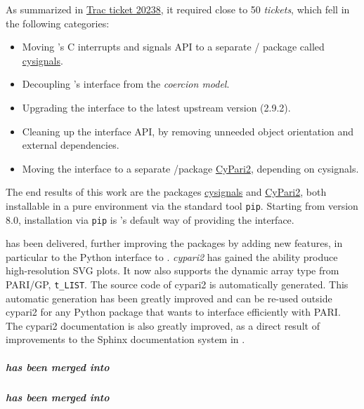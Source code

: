 As summarized in
\href{http://trac.sagemath.org/ticket/20238}{Trac ticket 20238},
it required close to 50 \emph{tickets}, which fell in the
following categories:

\begin{itemize}
\tightlist
\item Moving \Sage's C interrupts and signals API to a separate \Python/\Cython
  package called
  \href{https://github.com/sagemath/cysignals}{cysignals}.
\item Decoupling \Sage's \Pari interface from the \emph{coercion
    model}.
\item Upgrading the \Pari interface to the latest upstream version
  (2.9.2).
\item Cleaning up the \Pari interface API, by removing unneeded object
  orientation and external dependencies.
\item Moving the \Pari interface to a separate \Python/\Cython package
  \href{https://github.com/defeo/cypari2}{CyPari2}, depending
  on cysignals.
\end{itemize}

The end results of this work are the packages
\href{https://github.com/sagemath/cysignals}{cysignals} and
\href{https://github.com/defeo/cypari2}{CyPari2}, both installable
in a pure \Python environment via the standard tool
\texttt{pip}. Starting from version 8.0, installation via \texttt{pip}
is \Sage's default way of providing the \Pari interface.

 has been delivered, further improving the \Pari packages
by adding new features, in particular to the Python interface to \Pari.
\emph{cypari2} has gained the ability produce high-resolution SVG plots.
It now also supports the dynamic array type from PARI/GP, \verb/t_LIST/.
The source code of cypari2 is automatically generated.
This automatic generation has been greatly improved
and can be re-used outside cypari2 for any Python package that wants to interface efficiently with PARI.
The cypari2 documentation is also greatly improved,
as a direct result of improvements to the Sphinx documentation system
in .

\subparagraph{
  has been merged into
}

\subparagraph{
  has been merged into
}

